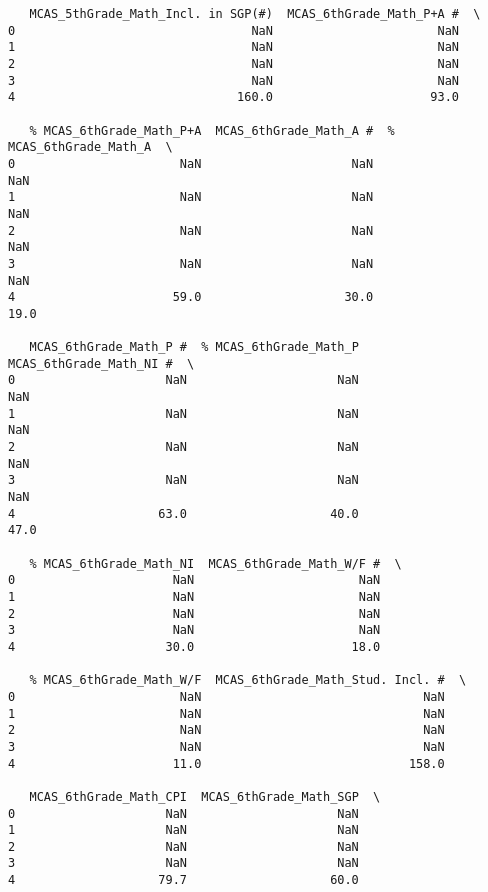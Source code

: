 \documentclass[11pt]{article}
\begin{document}
\begin{verbatim}
   MCAS_5thGrade_Math_Incl. in SGP(#)  MCAS_6thGrade_Math_P+A #  \
0                                 NaN                       NaN   
1                                 NaN                       NaN   
2                                 NaN                       NaN   
3                                 NaN                       NaN   
4                               160.0                      93.0   

   % MCAS_6thGrade_Math_P+A  MCAS_6thGrade_Math_A #  % MCAS_6thGrade_Math_A  \
0                       NaN                     NaN                     NaN   
1                       NaN                     NaN                     NaN   
2                       NaN                     NaN                     NaN   
3                       NaN                     NaN                     NaN   
4                      59.0                    30.0                    19.0   

   MCAS_6thGrade_Math_P #  % MCAS_6thGrade_Math_P  MCAS_6thGrade_Math_NI #  \
0                     NaN                     NaN                      NaN   
1                     NaN                     NaN                      NaN   
2                     NaN                     NaN                      NaN   
3                     NaN                     NaN                      NaN   
4                    63.0                    40.0                     47.0   

   % MCAS_6thGrade_Math_NI  MCAS_6thGrade_Math_W/F #  \
0                      NaN                       NaN   
1                      NaN                       NaN   
2                      NaN                       NaN   
3                      NaN                       NaN   
4                     30.0                      18.0   

   % MCAS_6thGrade_Math_W/F  MCAS_6thGrade_Math_Stud. Incl. #  \
0                       NaN                               NaN   
1                       NaN                               NaN   
2                       NaN                               NaN   
3                       NaN                               NaN   
4                      11.0                             158.0   

   MCAS_6thGrade_Math_CPI  MCAS_6thGrade_Math_SGP  \
0                     NaN                     NaN   
1                     NaN                     NaN   
2                     NaN                     NaN   
3                     NaN                     NaN   
4                    79.7                    60.0   


\end{verbatim}
\end{document}
